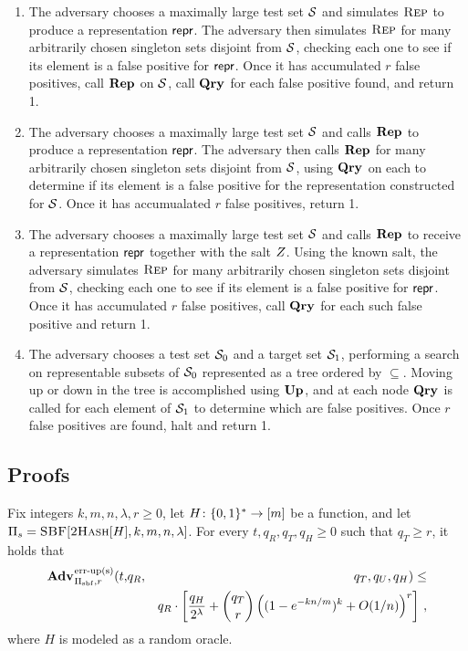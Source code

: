 \begin{enumerate}
 \item The adversary chooses a maximally large test set $\mathcal{S}$ and simulates $\textsc{Rep}$ to produce a representation $\mathsf{repr}$. The adversary then simulates $\textsc{Rep}$ for many arbitrarily chosen singleton sets disjoint from $\mathcal{S}$, checking each one to see if its element is a false positive for $\mathsf{repr}$. Once it has accumulated $r$ false positives, call $\mathbf{Rep}\hspace{0.5pt}$ on $\mathcal{S}$, call $\mathbf{Qry}\hspace{0.5pt}$ for each false positive found, and return 1.
 \item The adversary chooses a maximally large test set $\mathcal{S}$ and calls $\mathbf{Rep}\hspace{0.5pt}$ to produce a representation $\mathsf{repr}$. The adversary then calls $\mathbf{Rep}\hspace{0.5pt}$ for many arbitrarily chosen singleton sets disjoint from $\mathcal{S}$, using $\mathbf{Qry}\hspace{0.5pt}$ on each to determine if its element is a false positive for the representation constructed for $\mathcal{S}$. Once it has accumualated $r$ false positives, return 1.
 \item The adversary chooses a maximally large test set $\mathcal{S}$ and calls $\mathbf{Rep}\hspace{0.5pt}$ to receive a representation $\mathsf{repr}$ together with the salt $Z$. Using the known salt, the adversary simulates $\textsc{Rep}$ for many arbitrarily chosen singleton sets disjoint from $\mathcal{S}$, checking each one to see if its element is a false positive for $\mathsf{repr}$. Once it has accumulated $r$ false positives, call $\mathbf{Qry}\hspace{0.5pt}$ for each such false positive and return 1.
 \item The adversary chooses a test set $\mathcal{S}_0$ and a target set $\mathcal{S}_1$, performing a search on representable subsets of $\mathcal{S}_0$ represented as a tree ordered by $\subseteq$. Moving up or down in the tree is accomplished using $\mathbf{Up}\hspace{0.5pt}$, and at each node $\mathbf{Qry}\hspace{0.5pt}$ is called for each element of $\mathcal{S}_1$ to determine which are false positives. Once $r$ false positives are found, halt and return 1.
\end{enumerate}

\subsection{Proofs}

\begin{theorem}\label{thm:bf-priv-salt-bound}
Fix integers $k, m, n, \lambda, r\geq 0$, let $H \colon \{0,1\}^* \to [m]$ be a function, and let $\mathrm{\Pi}_s = \textsc{SBF}[\textsc{2Hash}[H],k,m,n,\lambda]$.
  For every $t, q_R, q_T, q_H \geq 0$ such that $q_T \geq r$, it holds that
  \begin{eqnarray*}
    \Adv{\erreps}_{\struct_\saltybloom,r}(t,&q_R,& q_T, q_U, q_H) \leq \\ && q_R \cdot
     \left[
      \frac{q_H}{2^\lambda} +
      {\dbinom{q_T}{r}} \left( (1-e^{-kn/m})^k + O(1/n) \right)^r
    \right] \,,
\end{eqnarray*}
where $H$ is modeled as a random oracle.
\end{theorem}


